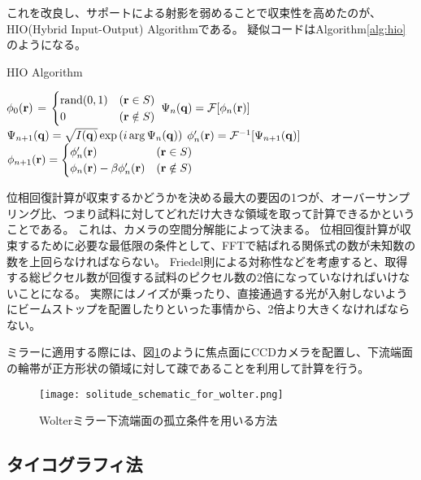 これを改良し、サポートによる射影を弱めることで収束性を高めたのが、HIO(Hybrid Input-Output) Algorithmである。
疑似コードはAlgorithm\ref{alg:hio}のようになる。

\begin{algorithm}                      
\caption{HIO Algorithm}         
\label{alg:hio}                          
\begin{algorithmic}
    \STATE $\phi_0(\mathbf{r})$
      = $\begin{cases}
        \mathrm{rand}(0,1) & (\mathbf{r} \in S) \\
        0 & (\mathbf{r} \notin S)
      \end{cases}$
    \STATE $\Psi_n(\mathbf{q}) = \mathcal F [\phi_n(\mathbf{r})]$
    \STATE $\Psi_{n+1}(\mathbf{q}) = \sqrt{I(\mathbf{q})} \exp \left( i \arg \Psi_n(\mathbf{q}) \right)$ 
    \STATE $\phi_n'(\mathbf{r}) = \mathcal F^{-1} [\Psi_{n+1}(\mathbf{q})]$
    \STATE $\phi_{n+1}(\mathbf{r})
      = \begin{cases}
          \phi_n'(\mathbf{r}) & (\mathbf{r} \in S) \\
          \phi_n(\mathbf{r}) - \beta \phi_n'(\mathbf{r}) & (\mathbf{r} \notin S)
      \end{cases}$
    \ENDFOR
\end{algorithmic}
\end{algorithm}

位相回復計算が収束するかどうかを決める最大の要因の1つが、オーバーサンプリング比、つまり試料に対してどれだけ大きな領域を取って計算できるかということである。
これは、カメラの空間分解能によって決まる。
位相回復計算が収束するために必要な最低限の条件として、FFTで結ばれる関係式の数が未知数の数を上回らなければならない。
Friedel則による対称性などを考慮すると、取得する総ピクセル数が回復する試料のピクセル数の2倍になっていなければいけないことになる。\cite{Latychevskaia2018}
実際にはノイズが乗ったり、直接通過する光が入射しないようにビームストップを配置したりといった事情から、2倍より大きくなければならない。

ミラーに適用する際には、図\ref{fig:solitude_schematic}のように焦点面にCCDカメラを配置し、下流端面の輪帯が正方形状の領域に対して疎であることを利用して計算を行う。

\begin{figure}[!ht]
\centering
\texttt{[image: solitude\_schematic\_for\_wolter.png]}
\caption{Wolterミラー下流端面の孤立条件を用いる方法}
\label{fig:solitude_schematic}
\end{figure}

\subsection{タイコグラフィ法}
\label{chap3_ptychography_introduction}

